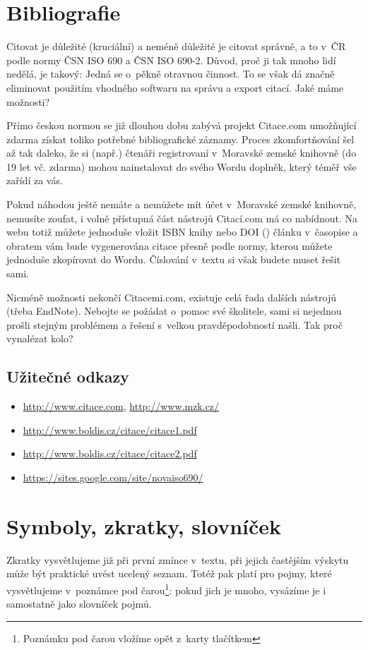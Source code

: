 \documentclass{template/socthesis}
\begin{document}
\section{Bibliografie}
Citovat je důležité (kruciální) a neméně důležité je citovat správně, a to v~ČR podle normy ČSN ISO 690 a ČSN ISO 690-2.
Důvod, proč ji tak mnoho lidí nedělá, je takový: Jedná se o~pěkně otravnou činnost\cite{citovani}.
To se však dá značně eliminovat použitím vhodného softwaru na správu a export citací.
Jaké máme možnosti?

Přímo českou normou se již dlouhou dobu zabývá projekt Citace.com umožňující zdarma získat toliko potřebné bibliografické záznamy.
Proces zkomfortňování šel až tak daleko, že si (např.) čtenáři registrovaní v~Moravské zemské knihovně (do 19 let vč.
zdarma) mohou nainstalovat do svého Wordu doplněk, který téměř vše zařídí za vás.

Pokud náhodou ještě nemáte a nemůžete mít účet v~Moravské zemské knihovně, nemusíte zoufat, i volně přístupná část nástrojů Citací.com má co nabídnout.
Na webu totiž můžete jednoduše vložit ISBN knihy nebo DOI () článku v~časopise a obratem vám bude vygenerována citace přesně podle normy, kterou můžete jednoduše zkopírovat do Wordu.
Číslování v~textu si však budete muset řešit sami.

Nicméně možnosti nekončí Citacemi.com, existuje celá řada dalších nástrojů (třeba EndNote).
Nebojte se požádat o~pomoc své školitele, sami si nejednou prošli stejným problémem a řešení s~velkou pravděpodobností našli.
Tak proč vynalézat kolo?

\subsection{Užitečné odkazy}
\begin{itemize}
    \item \url{http://www.citace.com}, \url{http://www.mzk.cz/}
	\item \url{http://www.boldis.cz/citace/citace1.pdf}
	\item \url{http://www.boldis.cz/citace/citace2.pdf}
	\item \url{https://sites.google.com/site/novaiso690/}
\end{itemize}

\section{Symboly, zkratky, slovníček}
Zkratky vysvětlujeme již při první zmínce v~textu, při jejich častějším výskytu může být praktické uvést ucelený seznam.
Totéž pak platí pro pojmy, které vysvětlujeme v~poznámce pod čarou\footnote{Poznámku pod čarou vložíme opět z~karty  tlačítkem }: pokud jich je mnoho, vysázíme je i samostatně jako slovníček pojmů.
\end{document}

